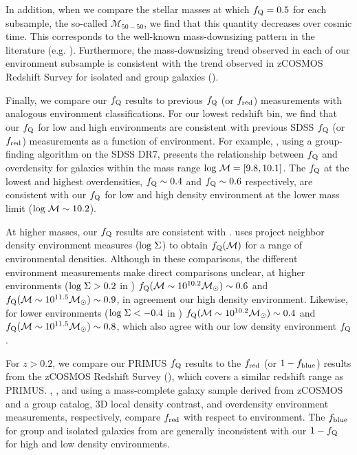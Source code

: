 \documentclass{emulateapj}
\begin{document}
In addition, when we compare the stellar masses at which $f_{\rm{Q}} = 0.5$ for each subsample, the so-called $\mathcal{M}_{50-50}$, we find that this quantity decreases over cosmic time. This corresponds to the well-known mass-downsizing pattern in the literature (e.g. \citealt{bundy06a}). Furthermore, the mass-downsizing trend observed in each of our environment subsample is consistent with the trend observed in zCOSMOS Redshift Survey for isolated and group galaxies (\citealt{Iovino:2010aa}). %

Finally, we compare our $f_{\rm{Q}}$ results to previous $f_{\rm{Q}}$ (or $f_{\rm{red}}$) measurements with analogous environment classifications. For our lowest redshift bin, we find that our $f_{\rm{Q}}$ for low and high environments are consistent with previous SDSS $f_{\rm{Q}}$ (or $f_{\rm{red}}$) measurements as a function of environment. For example, \cite{Tinker:2011aa}, using a group-finding algorithm on the SDSS DR7, presents the relationship between $f_{\rm{Q}}$ and overdensity for galaxies within the mass range $\rm{log} \; \mathcal{M} = [9.8, 10.1]$. The \cite{Tinker:2011aa} $f_{\rm{Q}}$ at the lowest and highest overdensities, $f_{\rm{Q}} \sim 0.4$ and $f_{\rm{Q}} \sim 0.6$ respectively, are consistent with our $f_{\rm{Q}}$ for low and high density environment at the lower mass limit ($\rm{log} \; \mathcal{M} \sim 10.2$). 

At higher masses, our $f_{\rm{Q}}$ results are consistent with \cite{Baldry:2006aa}. \cite{Baldry:2006aa} uses project neighbor density environment measures ($\rm{log} \;  \Sigma$) to obtain $f_{\rm{Q}}(\mathcal{M})$ for a range of environmental densities. Although in these comparisons, the different environment measurements make direct comparisons unclear, at higher environments ($\rm{log} \; \Sigma > 0.2$ in \citealt{Baldry:2006aa}) $f_{\rm{Q}}(\mathcal{M} \sim 10^{10.2} \mathcal{M}_{\odot}) \sim 0.6$ and $f_{\rm{Q}}(\mathcal{M} \sim 10^{11.5} \mathcal{M}_{\odot}) \sim 0.9$, in agreement our high density environment. Likewise, for lower environments ($\rm{log} \; \Sigma < -0.4$ in \citealt{Baldry:2006aa}) $f_{\rm{Q}}(\mathcal{M} \sim 10^{10.2} \mathcal{M}_{\odot}) \sim 0.4$ and $f_{\rm{Q}}(\mathcal{M} \sim 10^{11.5} \mathcal{M}_{\odot}) \sim 0.8$, which also agree with our low density environment $f_{\rm{Q}}$. 

For $z > 0.2$, we compare our PRIMUS $f_{\rm{Q}}$ results to the $f_{\rm{red}}$ (or $1-f_{\rm{blue}}$) results from the zCOSMOS Redshift Survey (\citealt{Iovino:2010aa, Cucciati:2010aa, Kovac:2014aa}), which covers a similar redshift range as PRIMUS. \cite{Iovino:2010aa}, \cite{Cucciati:2010aa}, and \cite{Kovac:2014aa} using a mass-complete galaxy sample derived from zCOSMOS and a group catalog, 3D local density contrast, and overdensity environment measurements, respectively, compare $f_{\rm{red}}$ with respect to environment. The $f_{\rm{blue}}$ for group and isolated galaxies from \cite{Iovino:2010aa} are generally inconsistent with our $1-f_{\rm{Q}}$ for high and low density environments. 
\end{document}
